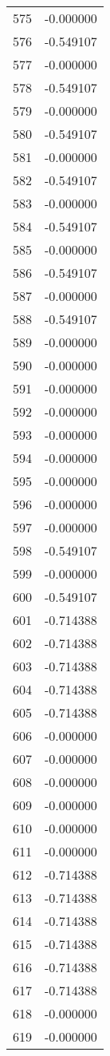 \documentclass[12pt]{article}
\begin{document}
\begin{longtable}{@{}cc@{}}
575 & -0.000000 \\
576 & -0.549107 \\
577 & -0.000000 \\
578 & -0.549107 \\
579 & -0.000000 \\
580 & -0.549107 \\
581 & -0.000000 \\
582 & -0.549107 \\
583 & -0.000000 \\
584 & -0.549107 \\
585 & -0.000000 \\
586 & -0.549107 \\
587 & -0.000000 \\
588 & -0.549107 \\
589 & -0.000000 \\
590 & -0.000000 \\
591 & -0.000000 \\
592 & -0.000000 \\
593 & -0.000000 \\
594 & -0.000000 \\
595 & -0.000000 \\
596 & -0.000000 \\
597 & -0.000000 \\
598 & -0.549107 \\
599 & -0.000000 \\
600 & -0.549107 \\
601 & -0.714388 \\
602 & -0.714388 \\
603 & -0.714388 \\
604 & -0.714388 \\
605 & -0.714388 \\
606 & -0.000000 \\
607 & -0.000000 \\
608 & -0.000000 \\
609 & -0.000000 \\
610 & -0.000000 \\
611 & -0.000000 \\
612 & -0.714388 \\
613 & -0.714388 \\
614 & -0.714388 \\
615 & -0.714388 \\
616 & -0.714388 \\
617 & -0.714388 \\
618 & -0.000000 \\
619 & -0.000000 \\

\end{longtable}
\end{document}
